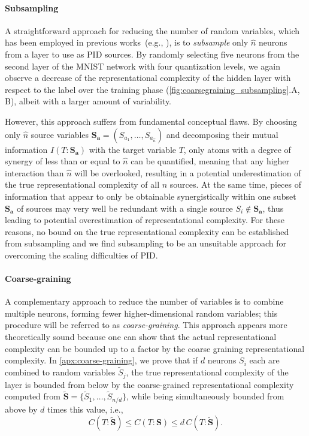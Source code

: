 \documentclass[10pt]{article}
\renewcommand\autoref[1]{\cref{#1}}
\theoremstyle{definition}
\theoremstyle{plain}
\begin{document}
\paragraph{Subsampling}

A straightforward approach for reducing the number of random variables, which has been employed in previous works~(e.g., \citealp{tax_partial_2017}), is to \textit{subsample} only $\hat{n}$ neurons from a layer to use as PID sources.
By randomly selecting five neurons from the second layer of the MNIST network with four quantization levels, we again observe a decrease of the representational complexity of the hidden layer with respect to the label over the training phase (\autoref{fig:coarsegraining_subsampling}.A, B), albeit with a larger amount of variability.

However, this approach suffers from fundamental conceptual flaws. By choosing only $\hat{n}$ source variables $\bm{S}_{\bm{a}} = (S_{a_1}, \dots, S_{a_{\hat{n}}})$ and decomposing their mutual information $I(T:\bm{S}_{\bm{a}})$ with the target variable $T$, only atoms with a degree of synergy of less than or equal to $\hat{n}$ can be quantified, meaning that any higher interaction than $\hat n$ will be overlooked, resulting in a potential underestimation of the true representational complexity of all $n$ sources. At the same time, pieces of information that appear to only be obtainable synergistically within one subset $\bm{S}_{\bm{a}}$ of sources may very well be redundant with a single source $S_i \notin \bm{S}_{\bm{a}}$, thus leading to potential overestimation of representational complexity. For these reasons, no bound on the true representational complexity can be established from subsampling and we find subsampling to be an unsuitable approach for overcoming the scaling difficulties of PID.

\paragraph{Coarse-graining}

A complementary approach to reduce the number of variables is to combine multiple neurons, forming fewer higher-dimensional random variables; this procedure will be referred to as \textit{coarse-graining}. This approach appears more theoretically sound because one can show that the actual representational complexity can be bounded up to a factor by the coarse graining representational complexity. In \autoref{apx:coarse-graining}, we prove that if $d$ neurons $S_i$ each are combined to random variables $\tilde{S}_j$, the true representational complexity of the layer is bounded from below by the coarse-grained representational complexity computed from $\bm{\tilde{S}} = \{\tilde{S}_1, \dots, \tilde{S}_{n/d}\}$, while being simultaneously bounded from above by $d$ times this value, i.e.,
\begin{equation}
    C(T:\bm{\tilde{S}}) \leq C(T:\bm S) \leq d \, C(T:\bm{\tilde{S}}).
\end{equation}
\end{document}
